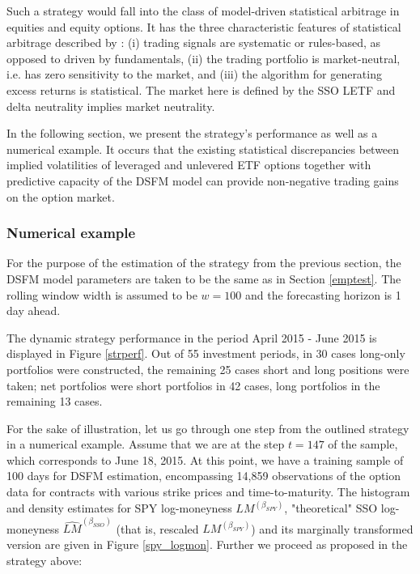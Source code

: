 \documentclass{rQUF2e}
\theoremstyle{plain}
\theoremstyle{definition}
\begin{document}
	Such a strategy would fall into the class of model-driven statistical arbitrage in equities and equity options. It has the three characteristic features of statistical arbitrage described by \citet{avellaneda_lee}: (i) trading signals are systematic or rules-based, as opposed to driven by fundamentals, (ii) the trading portfolio is market-neutral, i.e. has zero sensitivity to the market, and (iii) the algorithm for generating excess returns is statistical. The market here is defined by the SSO LETF and delta neutrality implies market neutrality.
	
	In the following section, we present the strategy's performance as well as a numerical example. It occurs that the existing statistical discrepancies between implied volatilities of leveraged and unlevered ETF options together with predictive capacity of the DSFM model can provide non-negative trading gains on the option market.  
	
	
	\subsubsection{Numerical example}
	\label{strat_ex}
	
	For the purpose of the estimation of the strategy from the previous section, the DSFM model parameters are taken to be the same as in Section \ref{emptest}. The rolling window width is assumed to be $w = 100$ and the forecasting horizon is 1 day ahead.
	
	The dynamic strategy performance in the period April 2015 - June 2015 is displayed in Figure \ref{strperf}. Out of 55 investment periods, in 30 cases long-only portfolios were constructed, the remaining 25 cases short and long positions were taken; net portfolios were short portfolios in 42 cases, long portfolios in the remaining 13 cases. 
	
	For the sake of illustration, let us go through one step from the outlined strategy in a numerical example. Assume that we are at the step $t = 147$ of the sample, which corresponds to June 18, 2015. At this point, we have a training sample of 100 days for DSFM estimation, encompassing 14,859 observations of the option data for contracts with various strike prices and time-to-maturity. The histogram and density estimates for SPY log-moneyness $LM^{(\beta_{SPY})}$, "theoretical" SSO log-moneyness $\widehat{LM}^{(\beta_{SSO})}$ (that is, rescaled $LM^{(\beta_{SPY})}$) and its marginally transformed version are given in Figure \ref{spy_logmon}. Further we proceed as proposed in the strategy above:
	
\end{document}
